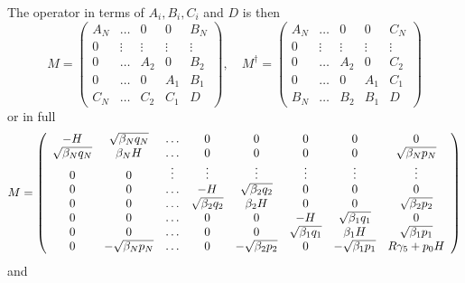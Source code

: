 \documentclass[12pt]{article}
\begin{document}
The operator in terms of $A_i, B_i, C_i$ and $D$ is then 
\begin{equation}
M = \left( \begin{array}{ccccc}
A_N & \ldots & 0 & 0 & B_N \\
0   &  \vdots & \vdots &\vdots & \vdots \\
0   & \ldots  & A_2 & 0 & B_2 \\
0   & \ldots  &  0  & A_1 & B_1 \\
C_N & \ldots  & C_2 & C_1 &  D  
\end{array} \right),\quad
M^{\dagger} = \left( \begin{array}{ccccc}
A_N & \ldots & 0 & 0 & C_N \\
0   &  \vdots & \vdots &\vdots & \vdots \\
0   & \ldots  & A_2 & 0 & C_2 \\
0   & \ldots  &  0  & A_1 & C_1 \\
B_N & \ldots  & B_2 & B_1 &  D  
\end{array} \right) 
\end{equation}
or in full
\begin{equation}
M = \left( \begin{array}{cccccccc}
-H & \sqrt{\beta_N q_N}& \ldots & 0 & 0 & 0 & 0 & 0 \\
\sqrt{\beta_N q_N} & \beta_N H & \ldots & 0 & 0 & 0& 0 & \sqrt{\beta_N p_N } \\
 0  &  0  &  \vdots & \vdots & \vdots & \vdots & \vdots & \vdots \\
 0  &  0  & \ldots  & -H  & \sqrt{\beta_2 q_2} & 0 & 0 &  0 \\
 0  &  0  & \ldots  & \sqrt{\beta_2 q_2} & \beta_2 H & 0 & 0 & \sqrt{\beta_2 p_2} \\
 0  &  0  & \ldots &         0        &  0 & -H & \sqrt{\beta_1 q_1} & 0 \\
 0  &  0  & \ldots &         0        &  0 & \sqrt{\beta_1 q_1} & \beta_1 H & \sqrt{\beta_1 p_1} \\
 0  & -\sqrt{\beta_N p_N} & \ldots & 0 & -\sqrt{\beta_2 p_2} & 0 & -\sqrt{\beta_1 p_1} & R \gamma_5 + p_0 H 
\end{array} \right)
\end{equation}
and
\end{document}
